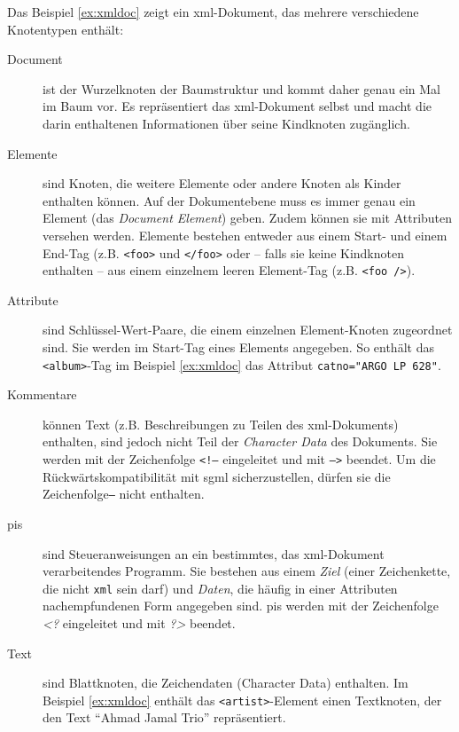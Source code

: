 Das Beispiel \ref{ex:xmldoc} zeigt ein \acrshort{xml}-Dokument, das mehrere verschiedene Knotentypen enthält:

\begin{description}
    \item[Document] ist der Wurzelknoten der Baumstruktur und kommt daher genau ein Mal im Baum vor. Es repräsentiert das \acrshort{xml}-Dokument selbst und macht die darin enthaltenen Informationen über seine Kindknoten zugänglich.~\cite[Abschnitt 2.1]{xmlinfoset}
    \item[Elemente] sind Knoten, die weitere Elemente oder andere Knoten als Kinder enthalten können. Auf der Dokumentebene muss es immer genau ein Element (das \emph{Document Element}) geben. Zudem können sie mit Attributen versehen werden. Elemente bestehen entweder aus einem Start- und einem End-Tag (z.B. \texttt{<foo>} und \texttt{</foo>} oder -- falls sie keine Kindknoten enthalten -- aus einem einzelnem leeren Element-Tag (z.B. \texttt{<foo />}).
    \item[Attribute] sind Schlüssel-Wert-Paare, die einem einzelnen Element-Knoten zugeordnet sind. Sie werden im Start-Tag eines Elements angegeben. So enthält das \texttt{<album>}-Tag im Beispiel \ref{ex:xmldoc} das Attribut \texttt{catno="ARGO LP 628"}.
    \item[Kommentare] können Text (z.B. Beschreibungen zu Teilen des \acrshort{xml}-Dokuments) enthalten, sind jedoch nicht Teil der \emph{Character Data} des Dokuments. Sie werden mit der Zeichenfolge \texttt{<!--} eingeleitet und mit \texttt{-->} beendet. Um die Rückwärtskompatibilität mit \acrshort{sgml} sicherzustellen, dürfen sie die Zeichenfolge\texttt{--} nicht enthalten.~\cite[Abschnitt 2.5]{maler2008xml}
    \item[\glspl{pi}] sind Steueranweisungen an ein bestimmtes, das \acrshort{xml}-Dokument verarbeitendes Programm. Sie bestehen aus einem \emph{Ziel} (einer Zeichenkette, die nicht \texttt{xml} sein darf) und \emph{Daten}, die häufig in einer Attributen nachempfundenen Form angegeben sind. \glspl{pi} werden mit der Zeichenfolge {\emph{<?}} eingeleitet und mit {\emph{?>}} beendet.~\cite[Abschnitt 2.6]{maler2008xml}
    \item[Text] sind Blattknoten, die Zeichendaten (Character Data) enthalten. Im Beispiel \ref{ex:xmldoc} enthält das \texttt{<artist>}-Element einen Textknoten, der den Text \enquote{Ahmad Jamal Trio} repräsentiert.
\end{description}

